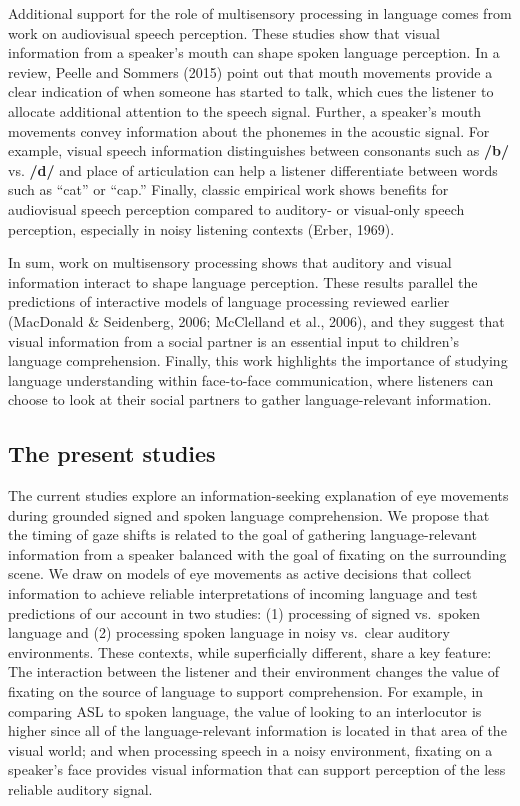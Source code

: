 \documentclass[,man,floatsintext]{apa6}
\begin{document}
Additional support for the role of multisensory processing in language comes from work on audiovisual speech perception. These studies show that visual information from a speaker's mouth can shape spoken language perception. In a review, Peelle and Sommers (2015) point out that mouth movements provide a clear indication of when someone has started to talk, which cues the listener to allocate additional attention to the speech signal. Further, a speaker's mouth movements convey information about the phonemes in the acoustic signal. For example, visual speech information distinguishes between consonants such as \textbf{/b/} vs. \textbf{/d/} and place of articulation can help a listener differentiate between words such as \enquote{cat} or \enquote{cap.} Finally, classic empirical work shows benefits for audiovisual speech perception compared to auditory- or visual-only speech perception, especially in noisy listening contexts (Erber, 1969).

In sum, work on multisensory processing shows that auditory and visual information interact to shape language perception. These results parallel the predictions of interactive models of language processing reviewed earlier (MacDonald \& Seidenberg, 2006; McClelland et al., 2006), and they suggest that visual information from a social partner is an essential input to children's language comprehension. Finally, this work highlights the importance of studying language understanding within face-to-face communication, where listeners can choose to look at their social partners to gather language-relevant information.

\hypertarget{the-present-studies}{%
\subsection{The present studies}\label{the-present-studies}}

The current studies explore an information-seeking explanation of eye movements during grounded signed and spoken language comprehension. We propose that the timing of gaze shifts is related to the goal of gathering language-relevant information from a speaker balanced with the goal of fixating on the surrounding scene. We draw on models of eye movements as active decisions that collect information to achieve reliable interpretations of incoming language and test predictions of our account in two studies: (1) processing of signed vs.~spoken language and (2) processing spoken language in noisy vs.~clear auditory environments. These contexts, while superficially different, share a key feature: The interaction between the listener and their environment changes the value of fixating on the source of language to support comprehension. For example, in comparing ASL to spoken language, the value of looking to an interlocutor is higher since all of the language-relevant information is located in that area of the visual world; and when processing speech in a noisy environment, fixating on a speaker's face provides visual information that can support perception of the less reliable auditory signal.
\end{document}
